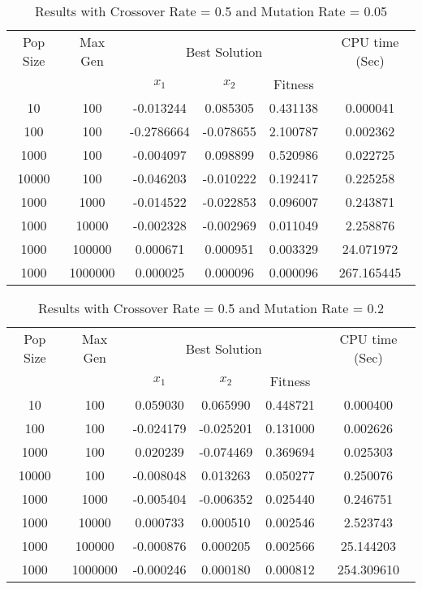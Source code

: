	\begin{table}[h!]
		\caption{Results with Crossover Rate = 0.5 and Mutation Rate = 0.05}
		\label{table:1}
		\centering
		\begin{tabular}{c c c c c c}
			\hline
			Pop Size & Max Gen & \multicolumn{3}{c}{Best Solution} & CPU time (Sec) \\
			& & $x_1$ & $x_2$ & Fitness & \\
			\hline
			10  & 100    &-0.013244  &0.085305  &0.431138 &0.000041\\
			100 & 100    &-0.2786664  &-0.078655  &2.100787 &0.002362\\
			1000& 100    &-0.004097  &0.098899  &0.520986 &0.022725\\
			10000& 100    &-0.046203  &-0.010222  &0.192417 &0.225258\\
			\hline
			1000  & 1000   &-0.014522  &-0.022853 &0.096007 &0.243871\\
			1000 & 10000  &-0.002328  &-0.002969  &0.011049 &2.258876\\
			1000& 100000 &0.000671  &0.000951  &0.003329 &24.071972\\
			1000& 1000000 &0.000025  &0.000096   &0.000096 &267.165445\\
	      \hline
		\end{tabular}
	\end{table}

	\begin{table}[h!]
		\caption{Results with Crossover Rate = 0.5 and Mutation Rate = 0.2}
		\label{table:1}
		\centering
		\begin{tabular}{c c c c c c}
			\hline
			Pop Size & Max Gen & \multicolumn{3}{c}{Best Solution} & CPU time (Sec) \\
			& & $x_1$ & $x_2$ & Fitness & \\
			\hline
			10  & 100    & 0.059030 & 0.065990  & 0.448721 &0.000400 \\
			100 & 100    & -0.024179 & -0.025201 & 0.131000 &0.002626\\
			1000& 100    &0.020239  &-0.074469  &0.369694 &0.025303\\
			10000& 100    &-0.008048  &0.013263 &0.050277 &0.250076\\
			\hline
			1000  & 1000   &-0.005404 &-0.006352 &0.025440 &0.246751\\
			1000 & 10000  &0.000733  &0.000510  &0.002546 &2.523743\\
			1000& 100000 &-0.000876  &0.000205   &0.002566 &25.144203\\
			1000& 1000000 &-0.000246  &0.000180  &0.000812 &254.309610\\
			\hline
		\end{tabular}
	\end{table}
	
